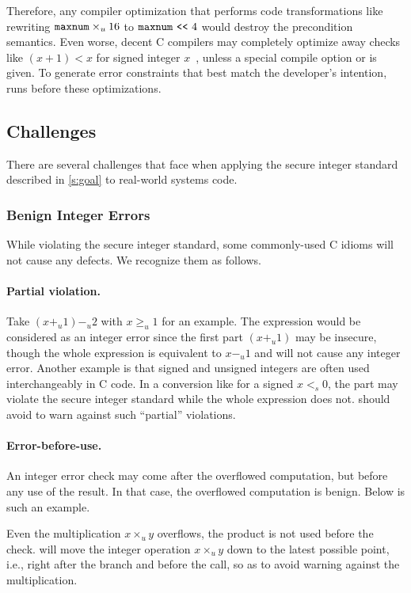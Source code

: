 Therefore, any compiler optimization that performs code transformations
like rewriting $\texttt{maxnum}\times_u 16$ to $\texttt{maxnum} \ \texttt{<}\texttt{<}\  4$
would destroy the precondition semantics.  Even worse, decent C
compilers may completely optimize away checks like $(x + 1) < x$
for signed integer $x$~\cite{gcc:signed-overflow,us-cert:gcc},
unless a special compile option  or 
is given.  To generate error constraints that best match the
developer's intention, \sys runs before these optimizations.

\subsection{Challenges}
\label{s:chal}

There are several challenges that face \sys when applying the
secure integer standard described in \autoref{s:goal} to real-world
systems code.

\subsubsection{Benign Integer Errors}

While violating the secure integer standard, some commonly-used C
idioms will not cause any defects.  We recognize them as follows.

\paragraph{Partial violation.}
Take $(x +_u 1) -_u 2$ with $x \geq_u 1$ for an example.  The
expression would be considered as an integer error since the first
part $(x +_u 1)$ may be insecure, though the whole expression is
equivalent to $x -_u 1$ and will not cause any integer error.
Another example is that signed and unsigned integers are often used
interchangeably in C code.  In a conversion like 
for a signed $x <_s 0$, the part  may violate the
secure integer standard while the whole expression does not.  \sys
should avoid to warn against such ``partial'' violations.

\paragraph{Error-before-use.}
An integer error check may come after the overflowed computation,
but before any use of the result.  In that case, the overflowed
computation is benign.  Below is such an example.

Even the multiplication $x \times_u y$ overflows, the product
 is not used before the check.  \sys will move the integer
operation $x \times_u y$ down to the latest possible point, i.e.,
right after the  branch and before the  call, so
as to avoid warning against the multiplication.

